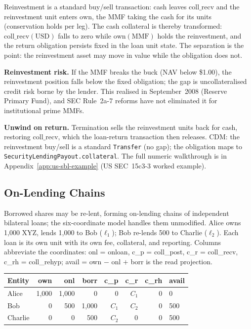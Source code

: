 \documentclass[11pt,a4paper]{article}
\begin{document}
Reinvestment is a standard buy/sell transaction: cash leaves $\mathrm{coll\_recv}$ and the reinvestment unit enters $\mathrm{own}$, the MMF taking the cash for its units (conservation holds per leg). The cash collateral is thereby transformed: $\mathrm{coll\_recv}(\text{USD})$ falls to zero while $\mathrm{own}(\text{MMF})$ holds the reinvestment, and the return obligation persists fixed in the loan unit state. The separation is the point: the reinvestment asset may move in value while the obligation does not.

\noindent\textbf{Reinvestment risk.} If the MMF breaks the buck (NAV below \$1.00), the reinvestment position falls below the fixed obligation; the gap is uncollateralised credit risk borne by the lender. This realised in September~2008 (Reserve Primary Fund), and SEC Rule~2a-7 reforms have not eliminated it for institutional prime MMFs.

\noindent\textbf{Unwind on return.} Termination sells the reinvestment units back for cash, restoring $\mathrm{coll\_recv}$, which the loan-return transaction then releases. CDM: the reinvestment buy/sell is a standard \texttt{Transfer} (no gap); the obligation maps to \texttt{SecurityLendingPayout.collateral}. The full numeric walkthrough is in Appendix~\ref{app:us-sbl-example} (US SEC~15c3-3 worked example).

\subsection{On-Lending Chains}
\label{sec:sbl-onlending}

Borrowed shares may be re-lent, forming on-lending chains of independent bilateral loans; the six-coordinate model handles them unmodified. Alice owns 1{,}000 XYZ, lends 1{,}000 to Bob ($\ell_1$); Bob re-lends 500 to Charlie ($\ell_2$). Each loan is its own unit with its own fee, collateral, and reporting. Columns abbreviate the coordinates: onl = onloan, c\_p = coll\_post, c\_r = coll\_recv, c\_rh = coll\_rehyp; avail = own $-$ onl $+$ borr is the read projection.

\begin{center}\small
\begin{tabular}{l r r r r r r l}
\toprule
\textbf{Entity} & own & onl & borr & c\_p & c\_r & c\_rh & avail \\
\midrule
Alice   & 1{,}000 & 1{,}000 & 0      & 0     & $C_1$ & 0 & 0 \\
Bob     & 0       & 500     & 1{,}000 & $C_1$ & $C_2$ & 0 & 500 \\
Charlie & 0       & 0       & 500     & $C_2$ & 0     & 0 & 500 \\
\bottomrule
\end{tabular}
\end{center}
\end{document}

